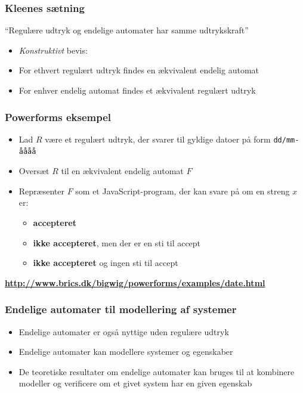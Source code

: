 \documentclass[]{beamer}
\begin{document}
\begin{frame}
\frametitle{Kleenes sætning}
“Regulære udtryk og endelige automater 
 har samme udtrykskraft”
\begin{itemize}
\item \emph{Konstruktivt} bevis:
\item For ethvert regulært udtryk findes en ækvivalent endelig automat
\item For enhver endelig automat findes et ækvivalent regulært udtryk
\end{itemize}
\end{frame}

\begin{frame}
\frametitle{Powerforms eksempel}
\begin{itemize}
\item Lad $R$ være et regulært udtryk, der svarer til gyldige datoer på form \texttt{dd/mm-åååå}
\item Oversæt $R$ til en ækvivalent endelig automat $F$
\item Repræsenter $F$ som et JavaScript-program, der kan svare på om en streng $x$ er:
\begin{itemize}
\item \textbf{accepteret}
\item \textbf{ikke accepteret}, men der er en sti til accept
\item \textbf{ikke accepteret} og ingen sti til accept
\end{itemize}
\end{itemize}
\small\textbf{\url{http://www.brics.dk/bigwig/powerforms/examples/date.html}}
\end{frame}

\begin{frame}
\frametitle{Endelige automater til modellering af systemer}
\begin{itemize}
\item Endelige automater er også nyttige uden regulære udtryk
\item Endelige automater kan modellere systemer og egenskaber
\item De teoretiske resultater om endelige automater kan bruges til at kombinere modeller og verificere om et givet system har en given egenskab
\end{itemize}
\end{frame}
\end{document}
